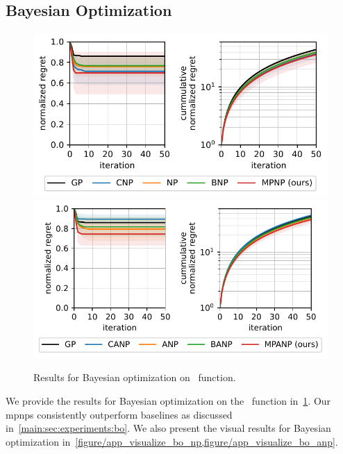 \subsection{Bayesian Optimization}
\label{app:sec:additional_experiments:bo}


\begin{figure}
\centering
\includegraphics[width=0.49\linewidth]{figure/app_bo_sob_np.pdf}
\includegraphics[width=0.49\linewidth]{figure/app_bo_sob_anp.pdf}
\caption{Results for Bayesian optimization on~\citet{sobester2008engineering} function.}
\label{figure/app_bo_sob}
\end{figure}
We provide the results for Bayesian optimization on the~\citet{sobester2008engineering} function in~\cref{figure/app_bo_sob}. Our \glspl{mpnp} consistently outperform baselines as discussed in~\cref{main:sec:experiments:bo}. We also present the visual results for Bayesian optimization in~\cref{figure/app_visualize_bo_np,figure/app_visualize_bo_anp}.

